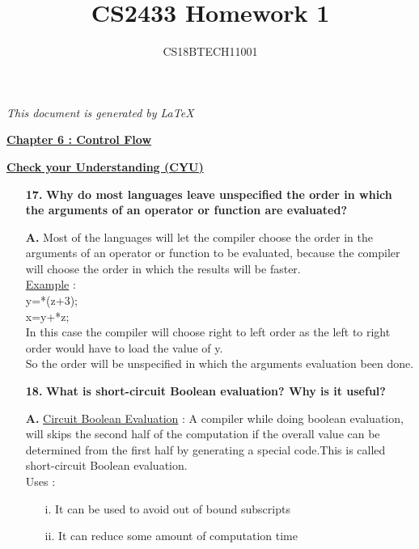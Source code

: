 \documentclass[letterpaper]{article}
\title{CS2433 Homework 1}
\author{CS18BTECH11001}
\begin{document}
\begin{large}
\maketitle
\begin{center}
\textit{This document is generated by \LaTeX}
\end{center}
\begin{flushleft}

\begin{center}
\underline{\textbf{Chapter 6 : Control Flow}}\\[0.2in] 
\end{center}
\textbf{\underline{Check your Understanding (CYU) }}\\[0.2in]
\begin{enumerate}

\item[\textbf{17.}]
\textbf{Why do most languages leave unspecified the order in which the arguments of an operator or function are evaluated?}
\item[\textbf{A.}]
Most of the languages will let the compiler choose the order in the arguments of an operator or function to be evaluated, because the compiler will choose the order in which the results will be faster. \\
\underline{Example} :\\[0.05in]
y=*(z+3);\\
x=y+*z;\\
In this case the compiler will choose right to left order as the left to right order would have to load the value of y.\\ 
So the order will be unspecified in which the arguments evaluation been done.\\[0.2in]

\item[\textbf{18.}]
\textbf{What is short-circuit Boolean evaluation? Why is it useful?}
\item[\textbf{A.}]
\underline{Circuit Boolean Evaluation} : A compiler while doing boolean evaluation, will skips the second half of the computation if the overall value can be determined from the first half by generating a special code.This is called short-circuit Boolean evaluation.\\[0.1in]
Uses :
\begin{enumerate}
\item[i.]It can be used to avoid out of bound subscripts
\item[ii.]It can reduce some amount of computation time\\[0.2in]
\end{enumerate}


\end{enumerate}
\end{flushleft}
\end{large}
\end{document}
